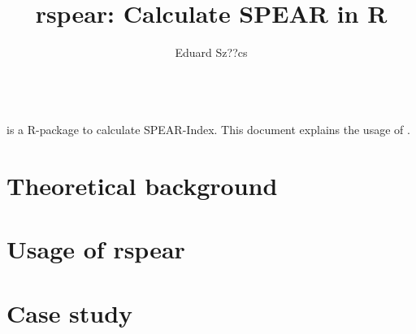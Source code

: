 \documentclass[article,nojss]{jss}
\title{rspear: Calculate SPEAR in R}
\author{Eduard Sz??cs}
\begin{document}


\tableofcontents

~\\[2ex]
\noindent {} is a R-package to calculate SPEAR-Index.  This
document explains the usage of .  

\section{Theoretical background}

\section{Usage of rspear}

\section{Case study}
\end{document}
